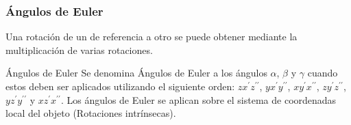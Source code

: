 \begin{frame}
    \frametitle{Ángulos de Euler}
    \scriptsize


    
    Una rotación de un de referencia a otro se puede obtener mediante la multiplicación de varias rotaciones.
    
    \begin{block}{Ángulos de Euler}
        Se denomina Ángulos de Euler a los ángulos $\alpha$, $\beta$ y $\gamma$ cuando estos deben ser aplicados utilizando el siguiente orden: $zx^{\prime}z^{\prime\prime}$, $yx^{\prime}y^{\prime\prime}$, $xy^{\prime}x^{\prime\prime}$, $zy^{\prime}z^{\prime\prime}$, $yz^{\prime}y^{\prime\prime}$ y $xz^{\prime}x^{\prime\prime}$. Los ángulos de Euler se aplican sobre el sistema de coordenadas local del objeto (Rotaciones intrínsecas).
    \end{block}
   

\end{frame}
